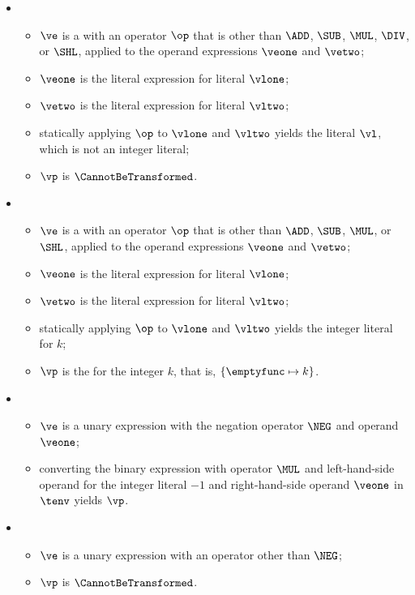 \begin{itemize}
  \item {}
  \begin{itemize}
    \item $\ve$ is a \binopexpressionterm{} with an operator $\op$ that is other than $\ADD$, $\SUB$, $\MUL$, $\DIV$, or $\SHL$,
          applied to the operand expressions $\veone$ and $\vetwo$;
    \item $\veone$ is the literal expression for literal $\vlone$;
    \item $\vetwo$ is the literal expression for literal $\vltwo$;
    \item statically applying $\op$ to $\vlone$ and $\vltwo$ yields the literal $\vl$, which is not an integer literal;
    \item $\vp$ is $\CannotBeTransformed$.
  \end{itemize}

  \item {}
  \begin{itemize}
    \item $\ve$ is a \binopexpressionterm{} with an operator $\op$ that is other than $\ADD$, $\SUB$, $\MUL$, or $\SHL$,
          applied to the operand expressions $\veone$ and $\vetwo$;
    \item $\veone$ is the literal expression for literal $\vlone$;
    \item $\vetwo$ is the literal expression for literal $\vltwo$;
    \item statically applying $\op$ to $\vlone$ and $\vltwo$ yields the integer literal for $k$;
    \item $\vp$ is the \symbolicexpressionterm{} for the integer $k$, that is, $\{ \emptyfunc\mapsto k \}$.
  \end{itemize}

  \item {}
  \begin{itemize}
    \item $\ve$ is a unary expression with the negation operator $\NEG$ and operand $\veone$;
    \item converting the binary expression with operator $\MUL$ and left-hand-side operand for the integer literal $-1$ and
    right-hand-side operand $\veone$ in $\tenv$ yields $\vp$\ProseOrTypeErrorOrCannotBeTransformed.
  \end{itemize}

  \item {}
  \begin{itemize}
    \item $\ve$ is a unary expression with an operator other than $\NEG$;
    \item $\vp$ is $\CannotBeTransformed$.
  \end{itemize}


\end{itemize}
